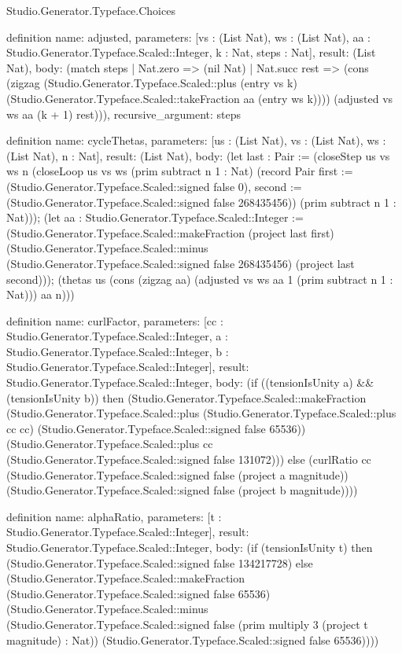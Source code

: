 \begin{lexlean}{Studio.Generator.Typeface.Choices}
\begin{semanticmodule}
definition{
  name: adjusted,
  parameters: [vs : (List Nat), ws : (List Nat), aa : Studio.Generator.Typeface.Scaled::Integer, k : Nat, steps : Nat],
  result: (List Nat),
  body: (match steps
    | Nat.zero => (nil Nat)
    | Nat.succ rest => (cons (zigzag (Studio.Generator.Typeface.Scaled::plus (entry vs k) (Studio.Generator.Typeface.Scaled::takeFraction aa (entry ws k)))) (adjusted vs ws aa (k + 1) rest))),
  recursive_argument: steps
}

definition{
  name: cycleThetas,
  parameters: [us : (List Nat), vs : (List Nat), ws : (List Nat), n : Nat],
  result: (List Nat),
  body: (let last : Pair := (closeStep us vs ws n (closeLoop us vs ws (prim subtract n 1 : Nat) (record Pair {first := (Studio.Generator.Typeface.Scaled::signed false 0), second := (Studio.Generator.Typeface.Scaled::signed false 268435456)}) (prim subtract n 1 : Nat))); (let aa : Studio.Generator.Typeface.Scaled::Integer := (Studio.Generator.Typeface.Scaled::makeFraction (project last first) (Studio.Generator.Typeface.Scaled::minus (Studio.Generator.Typeface.Scaled::signed false 268435456) (project last second))); (thetas us (cons (zigzag aa) (adjusted vs ws aa 1 (prim subtract n 1 : Nat))) aa n)))
}

definition{
  name: curlFactor,
  parameters: [cc : Studio.Generator.Typeface.Scaled::Integer, a : Studio.Generator.Typeface.Scaled::Integer, b : Studio.Generator.Typeface.Scaled::Integer],
  result: Studio.Generator.Typeface.Scaled::Integer,
  body: (if ((tensionIsUnity a) && (tensionIsUnity b)) then (Studio.Generator.Typeface.Scaled::makeFraction (Studio.Generator.Typeface.Scaled::plus (Studio.Generator.Typeface.Scaled::plus cc cc) (Studio.Generator.Typeface.Scaled::signed false 65536)) (Studio.Generator.Typeface.Scaled::plus cc (Studio.Generator.Typeface.Scaled::signed false 131072))) else (curlRatio cc (Studio.Generator.Typeface.Scaled::signed false (project a magnitude)) (Studio.Generator.Typeface.Scaled::signed false (project b magnitude))))
}

definition{
  name: alphaRatio,
  parameters: [t : Studio.Generator.Typeface.Scaled::Integer],
  result: Studio.Generator.Typeface.Scaled::Integer,
  body: (if (tensionIsUnity t) then (Studio.Generator.Typeface.Scaled::signed false 134217728) else (Studio.Generator.Typeface.Scaled::makeFraction (Studio.Generator.Typeface.Scaled::signed false 65536) (Studio.Generator.Typeface.Scaled::minus (Studio.Generator.Typeface.Scaled::signed false (prim multiply 3 (project t magnitude) : Nat)) (Studio.Generator.Typeface.Scaled::signed false 65536))))
}


\end{semanticmodule}
\end{lexlean}
